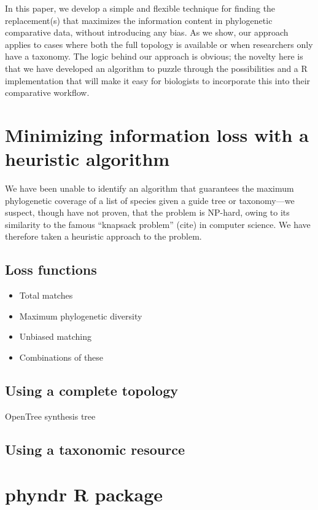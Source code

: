 \documentclass[a4paper,11pt]{article}
\begin{document}
In this paper, we develop a simple and flexible technique for finding the replacement(s) that maximizes the information content in phylogenetic comparative data, without introducing any bias. As we show, our approach applies to cases where both the full topology is available or when researchers only have a taxonomy. The logic behind our approach is obvious; the novelty here is that we have developed an algorithm to puzzle through the possibilities and a R implementation that will make it easy for biologists to incorporate this into their comparative workflow.

\section{Minimizing information loss with a heuristic algorithm}

We have been unable to identify an algorithm that guarantees the maximum phylogenetic coverage of a list of species given a guide tree or taxonomy---we suspect, though have not proven, that the problem is NP-hard, owing to its similarity to the famous ``knapsack problem'' (cite) in computer science. We have therefore taken a heuristic approach to the problem.

\subsection{Loss functions}
\begin{itemize}
\item Total matches
\item Maximum phylogenetic diversity
\item Unbiased matching
\item Combinations of these
\end{itemize}

\subsection{Using a complete topology}

OpenTree synthesis tree

\subsection{Using a taxonomic resource}

\section{phyndr R package}
\end{document}
